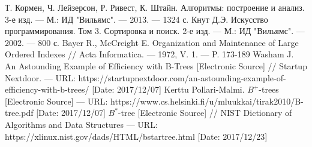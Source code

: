 \documentclass{llncs}
\begin{document}
	\begingroup
	\renewcommand{\section}[2]{}
	\begin{thebibliography}{}
		Т. Кормен, Ч. Лейзерсон, Р. Ривест, К. Штайн. Алгоритмы: построение и анализ. 3-е изд. --- М.: ИД "Вильямс". --- 2013. --- 1324 с.
		Кнут Д.Э. Искусство программирования. Том 3. Сортировка и поиск. 2-е изд. --- М.: ИД "Вильямс". --- 2002. --- 800 с.
		Bayer R., McCreight E. Organization and Maintenance of Large Ordered Indexes // Acta Informatica. --- 1972, V. 1. --- P. 173-189
		Washam J. An Astounding Example of Efficiency with B-Trees [Electronic Source] // Startup Nextdoor. --- URL: https://startupnextdoor.com/an-astounding-example-of-efficiency-with-b-trees/ [Date: 2017/12/07]
		Kerttu Pollari-Malmi. $B^+$-trees [Electronic Source] --- URL: https://www.cs.helsinki.fi/u/mluukkai/tirak2010/B-tree.pdf [Date: 2017/12/07]
		$B^*$-tree [Electronic Source] // NIST Dictionary of Algorithms and Data Structures --- URL: https://xlinux.nist.gov/dads/HTML/bstartree.html [Date: 2017/12/23]
	\end{thebibliography}
	
\end{document}

